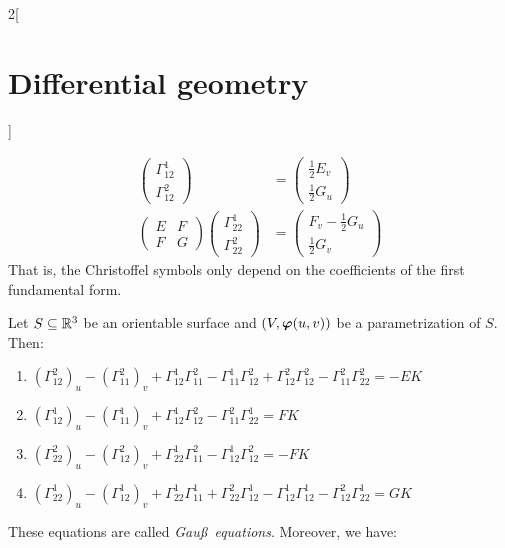 \documentclass[../../../main_math.tex]{subfiles}
\begin{document}
\begin{multicols}{2}[\section{Differential geometry}]
\begin{proposition}
\begin{align*}
\begin{pmatrix}
        \Gamma_{12}^1 \\
        \Gamma_{12}^2
      \end{pmatrix} & =\begin{pmatrix}
                         \frac{1}{2}E_v \\
                         \frac{1}{2}G_u
                       \end{pmatrix}     \\
      \begin{pmatrix}
        E & F \\
        F & G
      \end{pmatrix}
      \begin{pmatrix}
        \Gamma_{22}^1 \\
        \Gamma_{22}^2
      \end{pmatrix} & =\begin{pmatrix}
                         F_v-\frac{1}{2}G_u \\
                         \frac{1}{2}G_v
                       \end{pmatrix}
    \end{align*}
    That is, the Christoffel symbols only depend on the coefficients of the first fundamental form.
  \end{proposition}
  \begin{proposition}
    Let $S\subseteq\mathbb{R}^3$ be an orientable surface and $(V,\boldsymbol{\mathrm{\varphi}}(u,v))$ be a parametrization of $S$. Then:
    \begin{enumerate}
      \item $\displaystyle {\left(\Gamma_{12}^2\right)}_u-{\left(\Gamma_{11}^2\right)}_v +\Gamma_{12}^1\Gamma_{11}^2-\Gamma_{11}^1\Gamma_{12}^2+\Gamma_{12}^2\Gamma_{12}^2-\Gamma_{11}^2\Gamma_{22}^2=-EK$
      \item $\displaystyle {\left(\Gamma_{12}^1\right)}_u-{\left(\Gamma_{11}^1\right)}_v +\Gamma_{12}^1\Gamma_{12}^2-\Gamma_{11}^2\Gamma_{22}^1=FK$
      \item $\displaystyle {\left(\Gamma_{22}^2\right)}_u-{\left(\Gamma_{12}^2\right)}_v +\Gamma_{22}^1\Gamma_{11}^2-\Gamma_{12}^1\Gamma_{12}^2=-FK$
      \item $\displaystyle {\left(\Gamma_{22}^1\right)}_u-{\left(\Gamma_{12}^1\right)}_v +\Gamma_{22}^1\Gamma_{11}^1+\Gamma_{22}^2\Gamma_{12}^1-\Gamma_{12}^1\Gamma_{12}^1-\Gamma_{12}^2\Gamma_{22}^1=GK$
    \end{enumerate}
    These equations are called \emph{Gau\ss\ equations}. Moreover, we have:
    \begin{enumerate}\setcounter{enumi}{4}

\end{enumerate}
\end{proposition}
\end{multicols}
\end{document}
